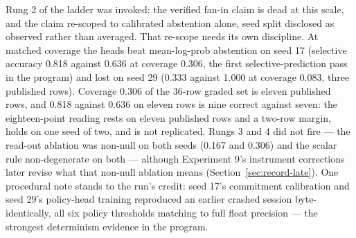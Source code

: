 \documentclass[10pt,a4paper]{article}
\begin{document}
Rung 2 of the ladder was invoked: the verified fan-in claim is dead at this scale, and the claim re-scoped to calibrated abstention alone, seed split disclosed as observed rather than averaged. That re-scope needs its own discipline. At matched coverage the heads beat mean-log-prob abstention on seed 17 (selective accuracy 0.818 against 0.636 at coverage 0.306, the first selective-prediction pass in the program) and lost on seed 29 (0.333 against 1.000 at coverage 0.083, three published rows). Coverage 0.306 of the 36-row graded set is eleven published rows, and 0.818 against 0.636 on eleven rows is nine correct against seven: the eighteen-point reading rests on eleven published rows and a two-row margin, holds on one seed of two, and is not replicated. Rungs 3 and 4 did not fire --- the read-out ablation was non-null on both seeds (0.167 and 0.306) and the scalar rule non-degenerate on both --- although Experiment 9's instrument corrections later revise what that non-null ablation means (Section~\ref{sec:record-late}). One procedural note stands to the run's credit: seed 17's commitment calibration and seed 29's policy-head training reproduced an earlier crashed session byte-identically, all six policy thresholds matching to full float precision --- the strongest determinism evidence in the program.
\end{document}
